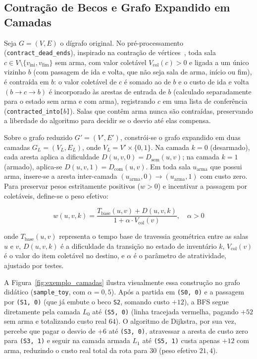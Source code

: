 \documentclass[conference]{IEEEtran}
\begin{document}
\subsection{Contra\c{c}\~ao de Becos e Grafo Expandido em Camadas}
Seja $G = (V, E)$ o d\'igrafo original. No pr\'e-processamento (\texttt{contract\_dead\_ends}), inspirado na contra\c{c}\~ao de v\'ertices~\cite{geisberger2008}, toda sala $c \in V \setminus \{v_{\text{ini}}, v_{\text{fim}}\}$ sem arma, com valor colet\'avel $V_{\text{col}}(c) > 0$ e ligada a um \'unico vizinho $b$ (com passagem de ida e volta, que n\~ao seja sala de arma, in\'icio ou fim), \'e contra\'ida em $b$: o valor colet\'avel de $c$ \'e somado ao de $b$ e o custo de ida e volta $(b \to c \to b)$ \'e incorporado \`as arestas de entrada de $b$ (calculado separadamente para o estado sem arma e com arma), registrando $c$ em uma lista de confer\^encia (\texttt{contracted\_into[$b$]}). Salas que cont\^em arma nunca s\~ao contra\'idas, preservando a liberdade do algoritmo para decidir se o desvio at\'e elas compensa.

Sobre o grafo reduzido $G' = (V', E')$, constr\'oi-se o grafo expandido em duas camadas $G_L = (V_L, E_L)$, onde $V_L = V' \times \{0, 1\}$. Na camada $k=0$ (desarmado), cada aresta aplica a dificuldade $D(u, v, 0) = D_{\text{sem}}(u,v)$; na camada $k=1$ (armado), aplica-se $D(u, v, 1) = D_{\text{com}}(u,v)$. Em toda sala $u_{\text{arma}}$ que possui arma, insere-se a aresta inter-camada $(u_{\text{arma}}, 0) \to (u_{\text{arma}}, 1)$ com custo zero. Para preservar pesos estritamente positivos ($w > 0$) e incentivar a passagem por colet\'aveis, define-se o peso efetivo:

\begin{equation}
w(u, v, k) = \frac{T_{\text{base}}(u, v) + D(u, v, k)}{1 + \alpha \cdot V_{\text{col}}(v)}, \quad \alpha > 0
\label{eq:peso_efetivo}
\end{equation}

\noindent onde $T_{\text{base}}(u,v)$ representa o tempo base de travessia geom\'etrica entre as salas $u$ e $v$, $D(u,v,k)$ \'e a dificuldade da transi\c{c}\~ao no estado de invent\'ario $k$, $V_{\text{col}}(v)$ \'e o valor do item colet\'avel no destino, e $\alpha$ \'e o par\^ametro de atratividade, ajustado por testes.

A Figura~\ref{fig:exemplo_camadas} ilustra visualmente essa constru\c{c}\~ao no grafo did\'atico (\texttt{sample\_toy}, com $\alpha=0{,}5$). Ap\'os a partida em \texttt{(S0, 0)} e a passagem por \texttt{(S1, 0)} (que j\'a embute o beco \texttt{S2}, somando custo $+12$), a BFS segue diretamente pela camada $L_0$ at\'e \texttt{(S5, 0)} (linha tracejada vermelha, pagando $+52$ sem arma e totalizando custo real $64$). O algoritmo de Dijkstra, por sua vez, percebe que pagar o desvio de $+6$ at\'e \texttt{(S3, 0)}, atravessar a aresta de custo zero para \texttt{(S3, 1)} e seguir na camada armada $L_1$ at\'e \texttt{(S5, 1)} custa apenas $+12$ com arma, reduzindo o custo real total da rota para $30$ (peso efetivo $21{,}4$).
\end{document}
